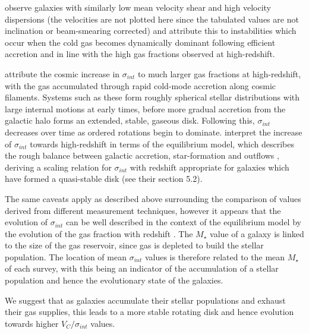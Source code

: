 \documentclass[fleqn,usenatbib]{mn2e}
\begin{document}
\cite{Law2009} observe galaxies with similarly low mean velocity shear and high velocity dispersions (the velocities are not plotted here since the tabulated values are not inclination or beam-smearing corrected) and attribute this to instabilities which occur when the cold gas becomes dynamically dominant following efficient accretion and in line with the high gas fractions observed at high-redshift. 

\cite{Law2009} attribute the cosmic increase in $\sigma_{int}$ to much larger gas fractions at high-redshift, with the gas accumulated through rapid cold-mode accretion along cosmic filaments.
Systems such as these form roughly spherical stellar distributions with large internal motions at early times, before more gradual accretion from the galactic halo forms an extended, stable, gaseous disk.
Following this, $\sigma_{int}$ decreases over time as ordered rotations begin to dominate.
\cite{Wisnioski2015} interpret the increase of $\sigma_{int}$ towards high-redshift in terms of the equilibrium model, which describes the rough balance between galactic accretion, star-formation and outflows \citep[e.g.][]{Lilly2013}, deriving a scaling relation for $\sigma_{int}$ with redshift appropriate for galaxies which have formed a quasi-stable disk (see their section 5.2).

The same caveats apply as described above surrounding the comparison of values derived from different measurement techniques, however it appears that the evolution of $\sigma_{int}$ can be well described in the context of the equilibrium model by the evolution of the gas fraction with redshift \citep{Wisnioski2015}.
The $M_{\star}$ value of a galaxy is linked to the size of the gas reservoir, since gas is depleted to build the stellar population.
The location of mean $\sigma_{int}$ values is therefore related to the mean $M_{\star}$ of each survey, with this being an indicator of the accumulation of a stellar population and hence the evolutionary state of the galaxies.

We suggest that as galaxies accumulate their stellar populations and exhaust their gas supplies, this leads to a more stable rotating disk and hence evolution towards higher $V_{C}/\sigma_{int}$ values.
\end{document}
